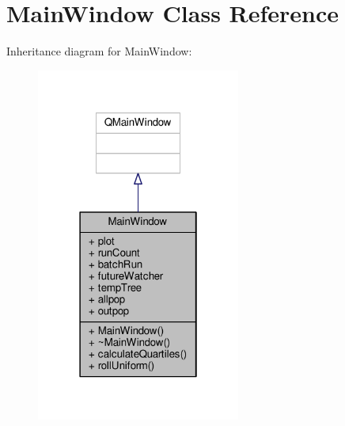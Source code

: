 \hypertarget{classMainWindow}{}\section{Main\+Window Class Reference}
\label{classMainWindow}


Inheritance diagram for Main\+Window\+:
\nopagebreak
\begin{figure}[H]
\begin{center}
\leavevmode
\includegraphics[width=190pt]{classMainWindow__inherit__graph}
\end{center}
\end{figure}


